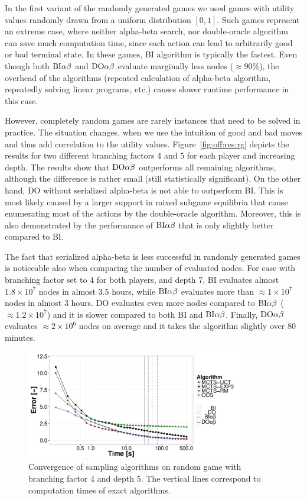 In the first variant of the randomly generated games we used games with utility values randomly drawn from a uniform distribution $[0,1]$. 
Such games represent an extreme case, where neither alpha-beta search, nor double-oracle algorithm can save much computation time, since each action can lead to arbitrarily good or bad terminal state. 
In these games, \textsc{BI} algorithm is typically the fastest.
Even though both $\textrm{BI}\alpha\beta$ and $\textrm{DO}\alpha\beta$ evaluate marginally less nodes ($\approx90\%$), the overhead of the algorithms (repeated calculation of alpha-beta algorithm, repeatedly solving linear programs, etc.) causes slower runtime performance in this case.

However, completely random games are rarely instances that need to be solved in practice.
The situation changes, when we use the intuition of good and bad moves and thus add correlation to the utility values.
Figure~\ref{fig:off:res:rg} depicts the results for two different branching factors $4$ and $5$ for each player and increasing depth.
The results show that $\textrm{DO}\alpha\beta$ outperforms all remaining algorithms, although the difference is rather small (still statistically significant).
On the other hand, \textsc{DO} without serialized alpha-beta is not able to outperform \textsc{BI}. 
This is most likely caused by a larger support in mixed subgame equilibria that cause enumerating most of the actions by the double-oracle algorithm. 
Moreover, this is also demonstrated by the performance of $\textrm{BI}\alpha\beta$ that is only slightly better compared to \textsc{BI}.

The fact that serialized alpha-beta is less successful in randomly generated games is noticeable also when comparing the number of evaluated nodes.
For case with branching factor set to $4$ for both players, and depth $7$, \textsc{BI} evaluates almost $1.8\times10^7$ nodes in almost $3.5$ hours, while $\textrm{BI}\alpha\beta$ evaluates more than $\approx1\times10^7$ nodes in almost $3$ hours. 
\textsc{DO} evaluates even more nodes compared to $\textrm{BI}\alpha\beta$ ($\approx1.2\times10^7$) and it is slower compared to both \textsc{BI} and $\textrm{BI}\alpha\beta$. 
Finally, $\textrm{DO}\alpha\beta$ evaluates $\approx2\times10^6$ nodes on average and it takes the algorithm slightly over $80$ minutes.

\begin{figure}[t]
\centering
\includegraphics[width=0.85\textwidth]{figures/convergence-rg.pdf}
\caption{Convergence of sampling algorithms on random game with branching factor $4$ and depth $5$. The vertical lines correspond to computation times of exact algorithms.} \label{fig:off:conv:rg}
\end{figure}


